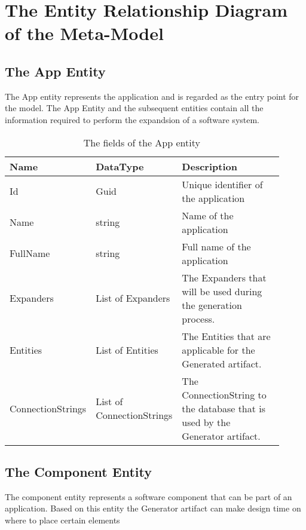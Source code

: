 \chapter{The Entity Relationship Diagram of the Meta-Model} \label{appendix_metamodel_description}  

\section{The App Entity}

The App entity represents the application and is regarded as the entry point for the
model. The App Entity and the subsequent entities contain all the information required to
perform the expandsion of a software system. 

\begin{table}[H]
    \small
    \begin{tabular}{ p{0.21\linewidth} p{0.21\linewidth} p{0.49\linewidth} }
        \hline
        \textbf{Name} & \textbf{DataType} & \textbf{Description} \\
        \hline
        Id & Guid & Unique identifier of the application \\
        Name & string & Name of the application \\
        FullName & string & Full name of the application \\
        Expanders & List of Expanders & The Expanders that will be used during the
        generation process. \\
        Entities & List of Entities & The Entities that are applicable for the Generated artifact. \\
        ConnectionStrings & List of ConnectionStrings & The ConnectionString to the
        database that is used by the Generator artifact. \\
        \hline
    \end{tabular}
    \caption{The fields of the App entity}
    \label{table:app_entity}
\end{table}

\section{The Component Entity}

The component entity represents a software component that can be part of an application.
Based on this entity the Generator artifact can make design time on where to place certain
elements  

